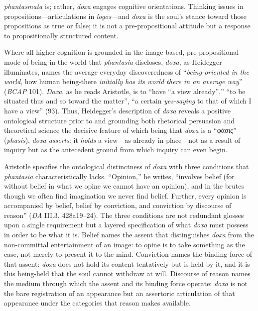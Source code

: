 \documentclass{article}
\newcommand{\gk}[1]{{\greekfont #1}}
\begin{document}
\textit{phantasmata} is; rather, \textit{doxa} engages cognitive orientations. Thinking issues in propositions---articulations in \textit{logos}---and \textit{doxa} is the soul's stance toward those propositions as true or false; it is not a pre-propositional attitude but a response to propositionally structured content.

Where all higher cognition is grounded in the image-based, pre-propositional mode of being-in-the-world that \textit{phantasia} discloses, \textit{doxa}, as Heidegger illuminates, names the average everyday discoveredness of ``\textit{being-oriented in the world}, how human being-there \textit{initially has its world there in an average way}'' (\textit{BCAP} 101). \textit{Doxa}, as he reads Aristotle, is to ``have ``a view already'','' ``to be situated thus and so toward the matter'', ``a certain \textit{yes-saying} to that of which I have a view'' (93). Thus, Heidegger's description of \textit{doxa} reveals a positive ontological structure prior to and grounding both rhetorical persuasion and theoretical science the decisive feature of which being that \textit{doxa} is a ``\gk{φάσις}'' (\textit{phasis}), \textit{doxa asserts}: it \textit{holds} a view---as already in place---not as a result of inquiry but as the antecedent ground from which inquiry can even begin. 

Aristotle specifies the ontological distinctness of \textit{doxa} with three conditions that \textit{phantasia} characteristically lacks. ``Opinion,'' he writes, ``involves belief (for without belief in what we opine we cannot have an opinion), and in the brutes though we often find imagination we never find belief. Further, every opinion is accompanied by belief, belief by conviction, and conviction by discourse of reason'' (\textit{DA} III.3, 428a19--24). The three conditions are not redundant glosses upon a single requirement but a layered specification of what \textit{doxa} must possess in order to be what it is. Belief names the assent that distinguishes \textit{doxa} from the non-committal entertainment of an image: to opine is to take something as the case, not merely to present it to the mind. Conviction names the binding force of that assent: \textit{doxa} does not hold its content tentatively but is held by it, and it is this being-held that the soul cannot withdraw at will. Discourse of reason names the medium through which the assent and its binding force operate: \textit{doxa} is not the bare registration of an appearance but an assertoric articulation of that appearance under the categories that reason makes available.
\end{document}
